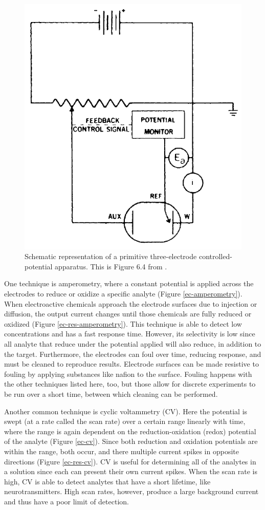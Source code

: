 \begin{figure}
	\centering
	\includegraphics[width=0.5\linewidth]{figures/kissinger-6-4.png}
	\caption[Schematic representation of a primitive three-electrode controlled-potential apparatus]{Schematic representation of a primitive three-electrode controlled-potential apparatus. This is Figure 6.4 from \cite{kissinger1996iai}.}
	\label{kissinger-6-4}
\end{figure}

One technique is amperometry, where a constant potential is applied across the electrodes to reduce or oxidize a specific analyte (Figure \ref{ec-amperometry}). When electroactive chemicals approach the electrode surfaces due to injection or diffusion, the output current changes until those chemicals are fully reduced or oxidized (Figure \ref{ec-res-amperometry}). This technique is able to detect low concentrations and has a fast response time. However, its selectivity is low since all analyte that reduce under the potential applied will also reduce, in addition to the target. Furthermore, the electrodes can foul over time, reducing response, and must be cleaned to reproduce results. Electrode surfaces can be made resistive to fouling by applying substances like nafion to the surface. Fouling happens with the other techniques listed here, too, but those allow for discrete experiments to be run over a short time, between which cleaning can be performed.

Another common technique is cyclic voltammetry (CV). Here the potential is swept (at a rate called the scan rate) over a certain range linearly with time, where the range is again dependent on the reduction-oxidation (redox) potential of the analyte (Figure \ref{ec-cv}). Since both reduction and oxidation potentials are within the range, both occur, and there multiple current spikes in opposite directions (Figure \ref{ec-res-cv}). CV is useful for determining all of the analytes in a solution since each can present their own current spikes. When the scan rate is high, CV is able to detect analytes that have a short lifetime, like neurotransmitters. High scan rates, however, produce a large background current and thus have a poor limit of detection.

